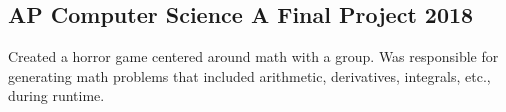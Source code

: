 \documentclass[../Resume.tex]{subfiles}
\begin{document}
    \subsection{AP Computer Science A Final Project \null\hfill 2018}
    \par Created a horror game centered around math with a group. Was responsible for generating math problems that included arithmetic, derivatives, integrals, etc., during runtime.
    \vspace*{-2mm}
\end{document}
